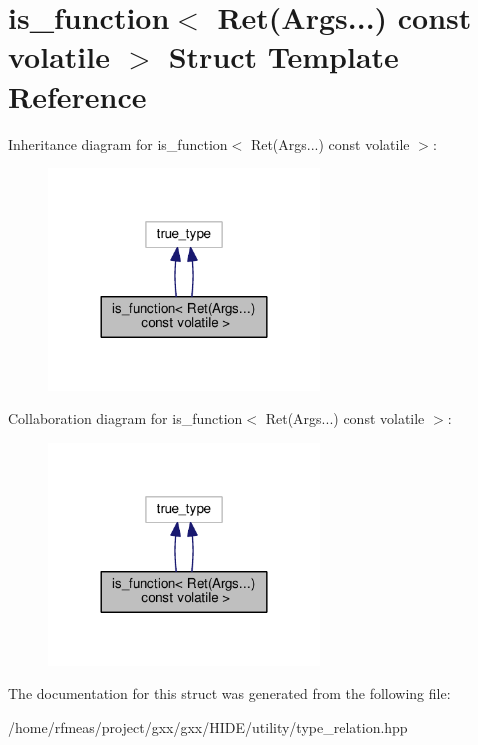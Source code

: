 \hypertarget{structis__function_3_01Ret_07Args_8_8_8_08_01const_01volatile_01_4}{}\section{is\+\_\+function$<$ Ret(Args...) const volatile $>$ Struct Template Reference}
\label{structis__function_3_01Ret_07Args_8_8_8_08_01const_01volatile_01_4}


Inheritance diagram for is\+\_\+function$<$ Ret(Args...) const volatile $>$\+:
\nopagebreak
\begin{figure}[H]
\begin{center}
\leavevmode
\includegraphics[width=204pt]{structis__function_3_01Ret_07Args_8_8_8_08_01const_01volatile_01_4__inherit__graph}
\end{center}
\end{figure}


Collaboration diagram for is\+\_\+function$<$ Ret(Args...) const volatile $>$\+:
\nopagebreak
\begin{figure}[H]
\begin{center}
\leavevmode
\includegraphics[width=204pt]{structis__function_3_01Ret_07Args_8_8_8_08_01const_01volatile_01_4__coll__graph}
\end{center}
\end{figure}


The documentation for this struct was generated from the following file\+:\begin{DoxyCompactItemize}
\item 
/home/rfmeas/project/gxx/gxx/\+H\+I\+D\+E/utility/type\+\_\+relation.\+hpp\end{DoxyCompactItemize}
